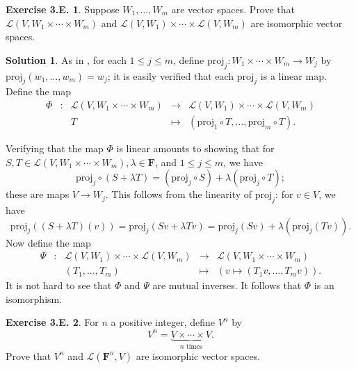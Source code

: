 \documentclass[12pt]{article}
\theoremstyle{definition}
\theoremstyle{exercise}
\newtheorem{exercise}{Exercise 3.E.}
\theoremstyle{solution}
\newtheorem*{solution}{Solution}
\newcommand{\lmap}{\mathcal{L}}
\newcommand{\F}{\mathbf{F}}
\begin{document}
\begin{exercise}
\label{ex:5}
    Suppose \( W_1, \ldots, W_m \) are vector spaces. Prove that \( \lmap(V, W_1 \times \cdots \times W_m) \) and \( \lmap(V, W_1) \times \cdots \times \lmap(V, W_m) \) are isomorphic vector spaces.
\end{exercise}

\begin{solution}
    As in , for each \( 1 \leq j \leq m \), define \( \text{proj}_j : W_1 \times \cdots \times W_m \to W_j \) by \( \text{proj}_j (w_1, \ldots, w_m) = w_j \); it is easily verified that each \( \text{proj}_j \) is a linear map. Define the map
    {\arraycolsep=1.8pt\def\arraystretch{1.5}
    \[
        \begin{array}{ccrcl}
            \Phi & : & \lmap(V, W_1 \times \cdots \times W_m) & \to & \lmap(V, W_1) \times \cdots \times \lmap(V, W_m) \\
            & & T & \mapsto & (\text{proj}_1 \circ T, \ldots, \text{proj}_m \circ T).
        \end{array}
    \]}

    Verifying that the map \( \Phi \) is linear amounts to showing that for \( S, T \in \lmap(V, W_1 \times \cdots \times W_m), \lambda \in \F \), and \( 1 \leq j \leq m \), we have
    \[
        \text{proj}_j \circ (S + \lambda T) = (\text{proj}_j \circ S) + \lambda (\text{proj}_j \circ T);
    \]
    these are maps \( V \to W_j \). This follows from the linearity of \( \text{proj}_j \): for \( v \in V \), we have
    \[
        \text{proj}_j((S + \lambda T)(v)) = \text{proj}_j(Sv + \lambda Tv) = \text{proj}_j(Sv) + \lambda (\text{proj}_j(Tv)).
    \]
    Now define the map
    {\arraycolsep=1.8pt\def\arraystretch{1.5}
    \[
        \begin{array}{ccrcl}
            \Psi & : & \lmap(V, W_1) \times \cdots \times \lmap(V, W_m) & \to & \lmap(V, W_1 \times \cdots \times W_m) \\
            & & (T_1, \ldots, T_m) & \mapsto & (v \mapsto (T_1 v, \ldots, T_m v)).
        \end{array}
    \]}
    It is not hard to see that \( \Phi \) and \( \Psi \) are mutual inverses. It follows that \( \Phi \) is an isomorphism.
\end{solution}

\begin{exercise}
\label{ex:6}
    For \( n \) a positive integer, define \( V^n \) by
    \[
        V^n = \underbrace{V \times \cdots \times V}_{n \text{ times}}.
    \]
    Prove that \( V^n \) and \( \lmap(\F^n, V) \) are isomorphic vector spaces.
\end{exercise}
\end{document}
